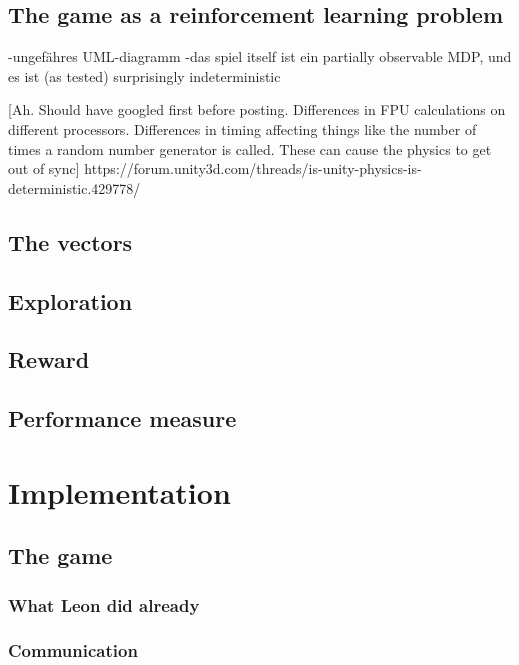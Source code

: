 \subsection{The game as a reinforcement learning problem}

-ungefähres UML-diagramm
-das spiel itself ist ein partially observable MDP, und es ist (as tested) surprisingly indeterministic

[Ah. Should have googled first before posting. Differences in FPU calculations on different processors. Differences in timing affecting things like the number of times a random number generator is called. These can cause the physics to get out of sync]
https://forum.unity3d.com/threads/is-unity-physics-is-deterministic.429778/

\subsection{The vectors}

\subsection{Exploration}

\subsection{Reward}

\subsection{Performance measure}

\section{Implementation}

\subsection{The game}

\subsubsection{What Leon did already}

\subsubsection{Communication}


